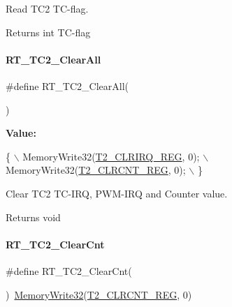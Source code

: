 Read T\+C2 T\+C-\/flag. 

\begin{DoxyReturn}{Returns}
int T\+C-\/flag 
\end{DoxyReturn}
\mbox{\label{a00047_a6b71644043f022558ee65f6197d0fe5d}} 
\paragraph{\texorpdfstring{R\+T\+\_\+\+T\+C2\+\_\+\+Clear\+All}{RT\_TC2\_ClearAll}}
{\footnotesize\ttfamily \#define R\+T\+\_\+\+T\+C2\+\_\+\+Clear\+All(\begin{DoxyParamCaption}{ }\end{DoxyParamCaption})}

{\bfseries Value\+:}
\begin{DoxyCode}
\{                                    \(\backslash\)
        MemoryWrite32(\mbox{\hyperlink{a00020_aba8ec9cd37a1487a613cca0194e62f15}{T2\_CLRIRQ\_REG}}, 0); \(\backslash\)
        MemoryWrite32(\mbox{\hyperlink{a00020_adbe130a3cc7c3109bab2ae344fcdcc11}{T2\_CLRCNT\_REG}}, 0); \(\backslash\)
    \}
\end{DoxyCode}


Clear T\+C2 T\+C-\/\+I\+RQ, P\+W\+M-\/\+I\+RQ and Counter value. 

\begin{DoxyReturn}{Returns}
void 
\end{DoxyReturn}
\mbox{\label{a00047_ab1818ddcd1db9a3582f3bc37e1d62881}} 
\paragraph{\texorpdfstring{R\+T\+\_\+\+T\+C2\+\_\+\+Clear\+Cnt}{RT\_TC2\_ClearCnt}}
{\footnotesize\ttfamily \#define R\+T\+\_\+\+T\+C2\+\_\+\+Clear\+Cnt(\begin{DoxyParamCaption}{ }\end{DoxyParamCaption})~\mbox{\hyperlink{a00020_a6b9732365b12e48ddb89fe1028b975b0}{Memory\+Write32}}(\mbox{\hyperlink{a00020_adbe130a3cc7c3109bab2ae344fcdcc11}{T2\+\_\+\+C\+L\+R\+C\+N\+T\+\_\+\+R\+EG}}, 0)}



